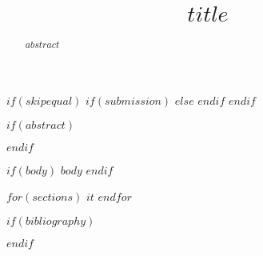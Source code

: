 \documentclass{article}
\title{$title$}
\begin{document}
\maketitle

$if(skipequal)$
$if(submission)$
$else$
$endif$
$endif$

$if(abstract)$
\begin{abstract}
  $abstract$
\end{abstract}
$endif$

$if(body)$
$body$
$endif$

$for(sections)$
$it$
$endfor$

$if(bibliography)$


$endif$


\end{document}

